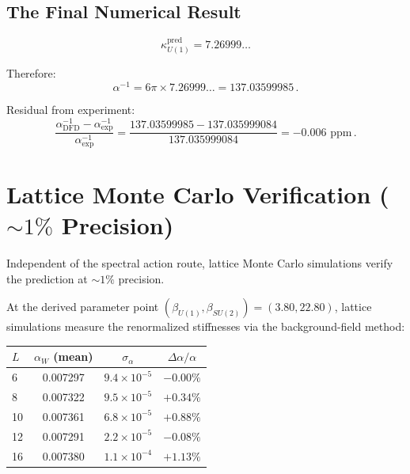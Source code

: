 \documentclass[12pt,a4paper]{article}
\begin{document}
\subsection{The Final Numerical Result}

\begin{equation}
\kappa_{U(1)}^{\mathrm{pred}} = 7.26999\ldots
\end{equation}

Therefore:
\begin{equation}
\alpha^{-1} = 6\pi \times 7.26999\ldots = 137.03599985\,.
\end{equation}

Residual from experiment:
\begin{equation}
\frac{\alpha^{-1}_{\mathrm{DFD}} - \alpha^{-1}_{\mathrm{exp}}}
     {\alpha^{-1}_{\mathrm{exp}}}
= \frac{137.03599985 - 137.035999084}{137.035999084}
= -0.006\text{~ppm}\,.
\end{equation}

\section{Lattice Monte Carlo Verification ($\sim 1\%$ Precision)}
\label{sec:lattice}

Independent of the spectral action route, lattice Monte Carlo
simulations verify the prediction at $\sim 1\%$ precision.

At the derived parameter point
$(\beta_{U(1)}, \beta_{SU(2)}) = (3.80, 22.80)$,
lattice simulations measure the renormalized stiffnesses via the
background-field method:

\begin{center}
\renewcommand{\arraystretch}{1.2}
\begin{tabular}{lccc}
\toprule
$L$ & $\alpha_W$ (mean) & $\sigma_\alpha$ & $\Delta\alpha/\alpha$ \\
\midrule
6 & 0.007297 & $9.4 \times 10^{-5}$ & $-0.00\%$ \\
8 & 0.007322 & $9.5 \times 10^{-5}$ & $+0.34\%$ \\
10 & 0.007361 & $6.8 \times 10^{-5}$ & $+0.88\%$ \\
12 & 0.007291 & $2.2 \times 10^{-5}$ & $-0.08\%$ \\
16 & 0.007380 & $1.1 \times 10^{-4}$ & $+1.13\%$ \\
\bottomrule
\end{tabular}
\end{center}
\end{document}
